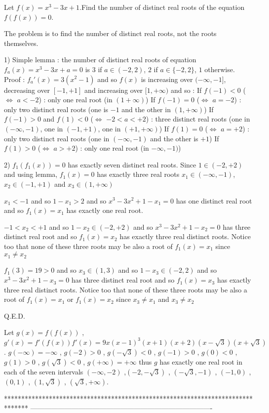 \begin{solution}
	\begin{tcolorbox}Let $f(x)=x^3-3x+1$.Find the number of distinct real roots of the equation$ f(f(x))=0$.\end{tcolorbox}
The problem is to find the number of distinct real roots, not the roots themselves.

1) Simple lemma : the number of distinct real roots of equation $f_a(x)=x^3-3x+a=0$ is $3$ if $a\in(-2,2)$, $2$ if $a\in\{-2,2\}$, $1$ otherwise.
Proof : $f_a'(x)=3(x^2-1)$ and so $f(x)$ is increasing over $(-\infty,-1]$, decreasing over $[-1,+1]$ and increasing over $[1,+\infty)$ and so :
If $f(-1)<0$  ($\iff$ $a<-2$) : only one real root (in $(1+\infty)$)
If $f(-1)=0$  ($\iff$ $a=-2$) : only two distinct real roots (one is $-1$ and the other in $(1,+\infty)$)
If $f(-1)>0$ and $f(1)<0$  ($\iff$ $-2<a<+2$) : three distinct real roots (one in $(-\infty,-1)$, one in $(-1,+1)$, one in $(+1,+\infty)$)
If $f(1)=0$  ($\iff$ $a=+2$) : only two distinct real roots (one in $(-\infty, -1)$ and the other is $+1$)
If $f(1)>0$  ($\iff$ $a>+2$) : only one real root (in $-\infty,-1)$)

2) $f_1(f_1(x))=0$ has exactly seven distinct real roots.
Since $1\in(-2,+2)$ and using lemma, $f_1(x)=0$ has exactly three real roots $x_1\in(-\infty,-1)$, $x_2\in(-1,+1)$ and $x_3\in(1,+\infty)$

$x_1<-1$ and so $1-x_1>2$ and so $x^3-3x^2+1-x_1=0$ has one distinct real root and so $f_1(x)=x_1$ has exactly one real root.

$-1<x_2<+1$ and so $1-x_2\in(-2,+2)$ and so $x^3-3x^2+1-x_2=0$ has three distinct real root and so $f_1(x)=x_2$ has exactly three real distinct roots.
Notice too that none of these three roots may be also a root of $f_1(x)=x_1$ since $x_1\ne x_2$

$f_1(3)=19>0$ and so $x_3\in(1,3)$ and so $1-x_3\in(-2,2)$ and so $x^3-3x^2+1-x_3=0$ has three distinct real root and so $f_1(x)=x_3$ has exactly three real distinct roots.
Notice too that none of these three roots may be also a root of $f_1(x)=x_1$ or $f_1(x)=x_2$ since $x_3\ne x_1$ and $x_3\ne x_2$

Q.E.D.
\end{solution}



\begin{solution}
	Let $g(x)=f(f(x))$ , $g'(x)=f'(f(x))f'(x)=9x(x-1)^3(x+1)(x+2)(x-\sqrt{3})(x+\sqrt{3})$.
$g(-\infty)=-\infty$ , $g(-2)>0$ , $g(-\sqrt{3})<0$ , $g(-1)>0$ , $g(0)<0$ , $g(1)>0$ , $g(\sqrt{3})<0$ , $g(+\infty)=+\infty$ thus $g$ has exactly one real root in each of the seven intervals $(-\infty,-2)$ ,$(-2,-\sqrt{3})$ , $(-\sqrt{3},-1)$ , $(-1,0)$ , $(0,1)$ , $(1,\sqrt{3})$ , $(\sqrt{3},+\infty)$.
\end{solution}
*******************************************************************************
-------------------------------------------------------------------------------

